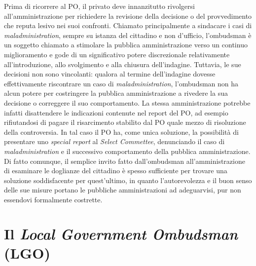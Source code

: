 \documentclass[12pt,it,a4paper,]{report}
\begin{document}
Prima di ricorrere al PO, il privato deve innanzitutto rivolgersi
all'amministrazione per richiedere la revisione della decisione o del
provvedimento che reputa lesivo nei suoi confronti. Chiamato
principalmente a sindacare i casi di \emph{maladministration}, sempre su
istanza del cittadino e non d'ufficio, l'ombudsman è un soggetto
chiamato a stimolare la pubblica amministrazione verso un continuo
miglioramento e gode di un significativo potere discrezionale
relativamente all'introduzione, allo svolgimento e alla chiusura
dell'indagine. Tuttavia, le sue decisioni non sono vincolanti: qualora
al termine dell'indagine dovesse effettivamente riscontrare un caso di
\emph{maladministration}, l'ombudsman non ha alcun potere per
costringere la pubblica amministrazione a rivedere la sua decisione o
correggere il suo comportamento. La stessa amministrazione potrebbe
infatti disattendere le indicazioni contenute nel report del PO, ad
esempio rifiutandosi di pagare il risarcimento stabilito dal PO quale
mezzo di risoluzione della controversia. In tal caso il PO ha, come
unica soluzione, la possibilità di presentare uno \emph{special report}
al \emph{Select Commettee}, denunciando il caso di
\emph{maladministration} e il successivo comportamento della pubblica
amministrazione. Di fatto comunque, il semplice invito fatto
dall'ombudsman all'amministrazione di esaminare le doglianze del
cittadino è spesso sufficiente per trovare una soluzione soddisfacente
per quest'ultimo, in quanto l'autorevolezza e il buon senso delle sue
misure portano le pubbliche amministrazioni ad adeguarvisi, pur non
essendovi formalmente costrette.

\hypertarget{il-local-government-ombudsman-lgo}{%
\section{\texorpdfstring{Il \emph{Local Government Ombudsman}
(LGO)}{Il Local Government Ombudsman (LGO)}}\label{il-local-government-ombudsman-lgo}}
\end{document}

